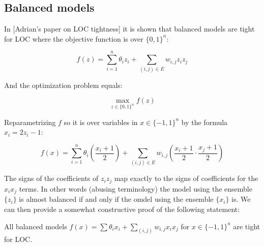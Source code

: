 \subsection{Balanced models}

In [Adrian's paper on LOC tightness] it is shown that balanced models are tight for LOC where the objective function is over $\{0,1\}^n$:

\begin{equation}
f(z)  = \sum_{i=1}^n \theta_i z_i + \sum_{(i,j) \in E} w_{i,j} z_iz_j 
\end{equation}

And the optimization problem equals:

\begin{equation}
\max_{z \in \{0,1\}^n} f(z)
\end{equation}

Reparametrizing $f$ so it is over variables in $x \in \{-1,1\}^n$ by the formula $x_i = 2z_i-1$:


\begin{equation}
f(x) = \sum_{i=1}^n \theta_i\left( \frac{x_i + 1}{2} \right) + \sum_{(i,j) \in E} w_{i,j} \left( \frac{x_i+1}{2} \cdot \frac{x_j + 1}{2} \right)
\end{equation}

The signs of the coefficients of $z_iz_j$ map exactly to the signs of coefficients for the $x_ix_j$ terms. In other words (abusing terminology) the model using the ensemble $\{z_i\}$ is almost balanced if and only if the omdel using the ensemble $\{x_i\}$ is. We can then provide a somewhat constructive proof of the following statement:

\begin{lemma}
All balanced models $f(x) = \sum \theta_i x_i + \sum_{(i,j)} w_{i,j} x_ix_j$ for $x \in \{-1,1\}^n$ are tight for LOC.
\end{lemma}


